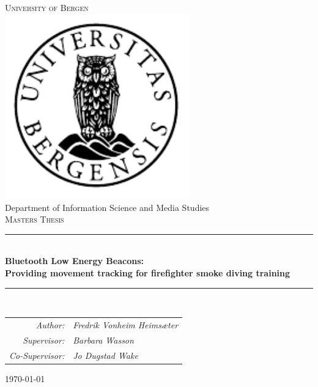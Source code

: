 \documentclass[../Main/thesis.tex]{subfiles}
\begin{document}

\newcommand{\HRule}{\rule{\linewidth}{0.5mm}}

\begin{titlepage}
\begin{center}
\textsc{\Huge University of Bergen}\\[0.4cm]
\includegraphics[width=8cm]{../fig/uib} \\[0.5cm]

\large Department of Information Science and Media Studies\\[0.7cm]
\textsc{\huge Masters Thesis}\\[0.4cm]
\HRule \\[0.4cm]
{ \huge \bfseries Bluetooth Low Energy Beacons: \\Providing movement tracking for firefighter smoke diving training}\\[0.5cm]
\HRule \\[1.0cm]

\begin{tabular}{rl}
\textit{Author:}        & \textit{Fredrik Vonheim Heimsæter} \\
\textit{Supervisor:}    & \textit{Barbara Wasson}            \\
\textit{Co-Supervisor:} & \textit{Jo Dugstad Wake}
\end{tabular}

\end{center}
\vfill
\begin{center}
{\large \today}
\end{center}
\end{titlepage}
\end{document}
